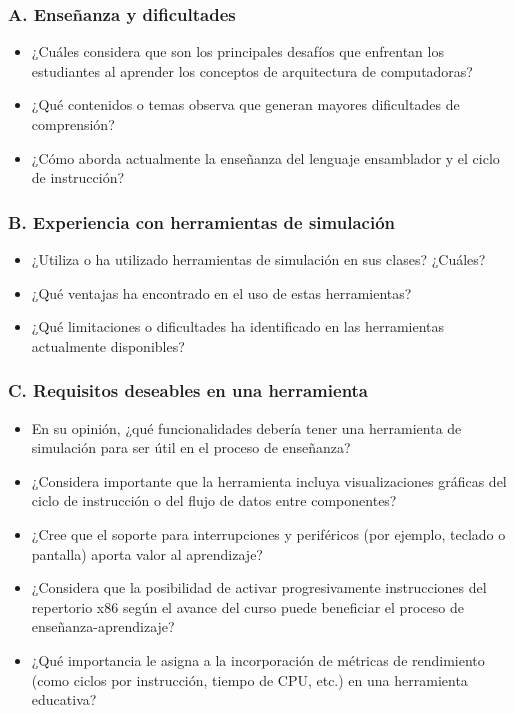 \documentclass[12pt,oneside]{templates/unerthesis}
\providecommand{\tightlist}{%
  \setlength{\itemsep}{0pt}\setlength{\parskip}{0pt}}
\begin{document}
\hypertarget{a.-enseuxf1anza-y-dificultades}{%
\subsubsection{A. Enseñanza y dificultades}\label{a.-enseuxf1anza-y-dificultades}}

\begin{itemize}
\tightlist
\item
  ¿Cuáles considera que son los principales desafíos que enfrentan los estudiantes al aprender los conceptos de arquitectura de computadoras?
\item
  ¿Qué contenidos o temas observa que generan mayores dificultades de comprensión?
\item
  ¿Cómo aborda actualmente la enseñanza del lenguaje ensamblador y el ciclo de instrucción?
\end{itemize}

\hypertarget{b.-experiencia-con-herramientas-de-simulaciuxf3n}{%
\subsubsection{B. Experiencia con herramientas de simulación}\label{b.-experiencia-con-herramientas-de-simulaciuxf3n}}

\begin{itemize}
\tightlist
\item
  ¿Utiliza o ha utilizado herramientas de simulación en sus clases? ¿Cuáles?
\item
  ¿Qué ventajas ha encontrado en el uso de estas herramientas?
\item
  ¿Qué limitaciones o dificultades ha identificado en las herramientas actualmente disponibles?
\end{itemize}

\hypertarget{c.-requisitos-deseables-en-una-herramienta}{%
\subsubsection{C. Requisitos deseables en una herramienta}\label{c.-requisitos-deseables-en-una-herramienta}}

\begin{itemize}
\tightlist
\item
  En su opinión, ¿qué funcionalidades debería tener una herramienta de simulación para ser útil en el proceso de enseñanza?
\item
  ¿Considera importante que la herramienta incluya visualizaciones gráficas del ciclo de instrucción o del flujo de datos entre componentes?
\item
  ¿Cree que el soporte para interrupciones y periféricos (por ejemplo, teclado o pantalla) aporta valor al aprendizaje?
\item
  ¿Considera que la posibilidad de activar progresivamente instrucciones del repertorio x86 según el avance del curso puede beneficiar el proceso de enseñanza-aprendizaje?
\item
  ¿Qué importancia le asigna a la incorporación de métricas de rendimiento (como ciclos por instrucción, tiempo de CPU, etc.) en una herramienta educativa?
\end{itemize}
\end{document}
